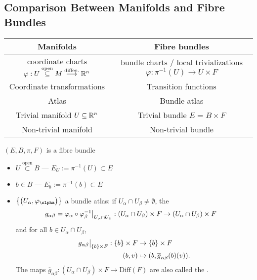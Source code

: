 \documentclass[main.tex]{subfiles}
\begin{document}
\subsection{Comparison Between Manifolds and Fibre Bundles}

\begin{center}
\begin{tabular}{|c|c|}
    \hline
   Manifolds  & Fibre bundles \\
   \hline
    coordinate charts $\varphi: U \overset{\text{open}}{\subseteq} M \overset{\text{diffeo.}}{\longrightarrow} \mathbb{R}^n$ & bundle charts / local trivializations $\varphi: \pi^{-1}(U) \to U \times F$ \\
    Coordinate transformations & Transition functions \\
    Atlas & Bundle atlas \\
    Trivial manifold $U \subseteq \mathbb{R}^n$ & Trivial bundle $E = B \times F$ \\
    Non-trivial manifold & Non-trivial bundle \\ 
    \hline
\end{tabular}
\end{center}

\begin{notation}
$(E,B, \pi, F)$ is a fibre bundle
\begin{itemize}
\item $U \overset{\text{open}}{\subset} B$ --- $E_U := \pi^{-1}(U) \subset E$
\item $b \in B$ --- $E_b := \pi^{-1}(b) \subset E$
\item $\brc{ \br{U_\alpha, \varphi_\slpha } }$ a bundle atlas: if $U_\alpha \cap U_\beta \neq\emptyset$, the 
\begin{align*}
    g_{\alpha\beta} = \varphi_\alpha \circ \varphi_\beta^{-1}\big|_{U_\alpha \cap U_\beta} : (U_\alpha \cap U_\beta) \times F &\to (U_\alpha \cap U_\beta) \times F
\end{align*}
and for all $b \in U_\alpha \cap U_\beta $, 
\begin{align*}
    g_{\alpha\beta}\big|_{\left\{b\right\}\times F} : \left\{b\right\}\times F &\to \left\{b\right\}\times F \\
                                            (b, v) &\mapsto (b, \overline{g}_{\alpha\beta}(b)(v)).
\end{align*}
The maps $\overline{g}_{\alpha\beta}: (U_\alpha \cap U_\beta) \times F \to \text{Diff}(F)$ are also called the .
\end{itemize}
\end{notation}
\end{document}
